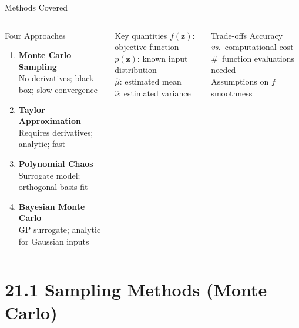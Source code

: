 \documentclass[aspectratio=169,10pt]{beamer}
\newcommand{\bz}{\mathbf{z}}
\newcommand{\hmu}{\hat{\mu}}
\newcommand{\hnu}{\hat{\nu}}
\begin{document}
\begin{frame}{Methods Covered}
  \begin{columns}[T]
      \begin{block}{Four Approaches}
        \begin{enumerate}
          \item \textbf{Monte Carlo Sampling}\\
                No derivatives; black-box; slow convergence
          \item \textbf{Taylor Approximation}\\
                Requires derivatives; analytic; fast
          \item \textbf{Polynomial Chaos}\\
                Surrogate model; orthogonal basis fit
          \item \textbf{Bayesian Monte Carlo}\\
                GP surrogate; analytic for Gaussian inputs
        \end{enumerate}
      \end{block}
      \begin{block}{Key quantities}
        $f(\bz)$: objective function\\
        $p(\bz)$: known input distribution\\
        $\hmu$: estimated mean\\
        $\hnu$: estimated variance
      \end{block}
      \begin{alertblock}{Trade-offs}
        Accuracy \textit{vs.}\ computational cost\\
        \#~function evaluations needed\\
        Assumptions on $f$ smoothness
      \end{alertblock}
  \end{columns}
\end{frame}

\section{21.1 Sampling Methods (Monte Carlo)}
\end{document}
